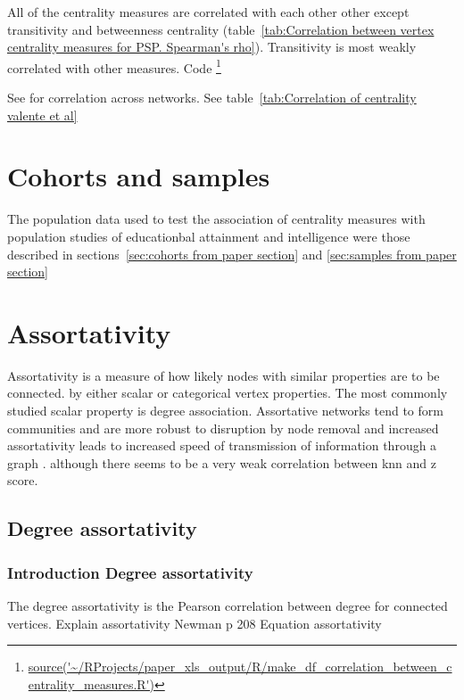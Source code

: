 All of the centrality measures are correlated with each other other except transitivity and betweenness centrality  (table~\ref{tab:Correlation between vertex centrality measures for PSP. Spearman's rho}). Transitivity is most weakly correlated with other measures. Code \footnote{\url{source('~/RProjects/paper_xls_output/R/make_df_correlation_between_centrality_measures.R')}}



See \cite{oldham2019consistency} for correlation across networks. See table~\ref{tab:Correlation of centrality valente et al}

\section{Cohorts and samples}
\label{Centrality:cohorts and samples}
The population data used to test the association of centrality measures with population studies of educationbal attainment and intelligence were those described in sections~\ref{sec:cohorts from paper section} and \ref{sec:samples from paper section}

\section{Assortativity}

Assortativity is a measure of how likely nodes with similar properties are to be connected. \cite{newman2002assortative} by either scalar or categorical vertex properties. The most commonly studied scalar property is degree association. Assortative networks tend to form communities and are more robust to disruption by node removal  \cite{newman2002assortative} and increased assortativity leads to increased speed of transmission of information through a graph \cite{noldus2015assortativity}.  although there seems to be a very weak correlation between knn and z score. 
\subsection{Degree assortativity}
\label{sec:degree assortativity}
\subsubsection{Introduction Degree assortativity}
The degree assortativity is the Pearson correlation between degree for connected vertices.\cite{noldus2015assortativity} Explain assortativity
Newman p 208
Equation assortativity


